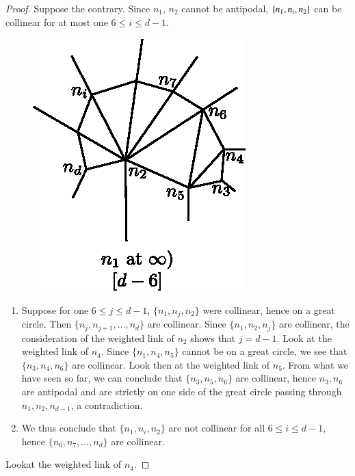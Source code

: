 \begin{proof}
Suppose the contrary. Since $n_1$, $n_2$ cannot be antipodal, $\{n_1,
n_i,\break n_2\}$ can be collinear for at most one $6 \leq i \leq d -1$. 
\begin{figure}[H]
\centering 
\includegraphics[scale=0.75]{vol58-fig/fig58-45.eps} 
\end{figure}
\begin{enumerate}[(1)]
\item Suppose for one $6 \leq j \leq d-1$, $\{n_1, n_j, n_2\}$ were
  collinear, hence on a great circle. Then $\{n_j, n_{j+1}, \ldots ,
  n_d\}$ are collinear. Since $\{n_1, n_2, n_j\}$ are collinear, the
  consideration of the weighted link of $n_2$ shows that $j=d-1$. Look
  at the weighted link of $n_4$. Since $\{n_1, n_4, n_5\}$ cannot be
  on a great circle, we see that $\{n_3, n_4, n_6\}$ are
  collinear. Look then at the weighted link of $n_5$. From what we
  have seen so far, we can conclude that $\{n_3, n_5, n_6\}$ are
  collinear, hence $n_3, n_6$ are antipodal and are strictly on one
  side of the great circle passing through $n_1, n_2, n_{d-1}$, a
  contradiction. 

\item We thus conclude that $\{n_1, n_i, n_2\}$ are not collinear for
  all $6 \leq i \leq d-1$, hence $\{n_6, n_7, \ldots , n_d \}$ are
  collinear. 
\end{enumerate}
Look\pageoriginale at the weighted link of $n_4$.
\end{proof}

